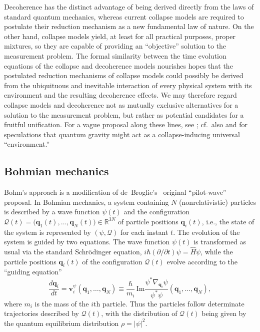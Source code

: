 \documentclass[twocolumn,rmp,aps,amsmath,amsfonts,noshowkeys,noshowpacs]{revtex4}
\newcommand{\cf}{cf.\ }
\begin{document}
Decoherence has the distinct advantage of being derived directly from
the laws of standard quantum mechanics, whereas current collapse
models are required to postulate their reduction mechanism as a new
fundamental law of nature. On the other hand, collapse models yield,
at least for all practical purposes, proper mixtures, so they are
capable of providing an ``objective'' solution to the measurement
problem. The formal similarity between the time evolution equations of
the collapse and decoherence models nourishes hopes that the
postulated reduction mechanisms of collapse models could possibly be
derived from the ubiquituous and inevitable interaction of every
physical system with its environment and the resulting decoherence
effects. We may therefore regard collapse models and decoherence not
as mutually exclusive alternatives for a solution to the measurement
problem, but rather as potential candidates for a fruitful
unification. For a vague proposal along these lines, see
\citet{Pessoa:1998:yl}; \cf also \citet{Diosi:1989:yb} and
\citet{Pearle:1999:cr} for speculations that quantum gravity might act
as a collapse-inducing universal ``environment.''


\subsection{Bohmian mechanics}

Bohm's approach \citep{Bohm:1952:rc,Bohm:1966:ps,Bohm:1993:ll} is a
modification of de~Broglie's~\citeyearpar{DeBroglie:1930:yt} original
``pilot-wave'' proposal. In Bohmian mechanics, a system containing $N$
(nonrelativistic) particles is described by a wave function $\psi(t)$
and the configuration $\mathcal{Q}(t)=\bigl(\mathbf{q}_1(t), \hdots,
\mathbf{q}_N(t)\bigr) \in \mathbb{R}^{3N}$ of particle positions
$\mathbf{q}_i(t)$, i.e., the state of the system is represented by
$(\psi, \mathcal{Q})$ for each instant $t$. The evolution of the
system is guided by two equations. The wave function $\psi(t)$
is transformed as usual via the standard Schr\"odinger equation, $i
\hbar (\partial / \partial t) \psi = \widehat{H}\psi$, while the
particle positions $\mathbf{q}_i(t)$ of the configuration
$\mathcal{Q}(t)$ evolve according to the ``guiding equation''
%
\begin{equation} \frac{d\mathbf{q}_i}{dt}  =
\mathbf{v}_i^\psi (\mathbf{q}_1, \hdots, \mathbf{q}_N) \equiv
\frac{\hbar}{m_i} \, \mathrm{Im} \frac{\psi^* \nabla_{\mathbf{q}_i}
  \psi}{\psi^*\psi} (\mathbf{q}_1, \hdots, \mathbf{q}_N), 
\end{equation}
%
where $m_i$ is the mass of the $i$th particle. Thus the particles
follow determinate trajectories described by $\mathcal{Q}(t)$, with
the distribution of $\mathcal{Q}(t)$ being given by the quantum
equilibrium distribution $\rho = |\psi|^2$.
\end{document}
